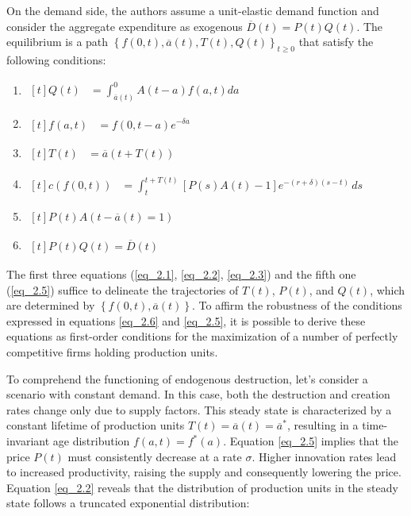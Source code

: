 \documentclass[12pt]{article}
\begin{document}
On the demand side, the authors assume a unit-elastic demand function and consider the aggregate expenditure as
exogenous 
\(\overline{D}(t)=P(t)Q(t)\). 
The equilibrium is a path \(\left\{f(0,t),\overline{a}(t),T(t),Q(t)\right\}_{t \geq 0}\) that satisfy the following
conditions:
\begin{enumerate}
    \item \label{eq_2.1} $ \begin{aligned}[t]
        Q(t) &= \int_{\overline{a}(t)}^{0}A(t-a)f(a,t)da
    \end{aligned}$
    \item \label{eq_2.2}$ \begin{aligned}[t]
        f(a,t)&=f(0,t-a)e^{-\delta a}      
    \end{aligned}$
    \item \label{eq_2.3}$ \begin{aligned}[t]
        T(t)&=\overline{a}\left(t+T(t)\right)        
    \end{aligned}$
    \item \label{eq_2.4}$ \begin{aligned}[t]
        c(f(0,t))&=\int_{t}^{t+T(t)}\left[P(s)A(t)-1\right]e^{-(r+\delta)(s-t)}\,ds
    \end{aligned}$
    \item \label{eq_2.5}$ \begin{aligned}[t]
        P(t)A(t-\overline{a}(t)=1)
    \end{aligned}$
    \item \label{eq_2.6}$ \begin{aligned}[t]
        P(t)Q(t)=\overline{D}(t)
    \end{aligned}$
\end{enumerate}
The first three equations (\ref{eq_2.1}, \ref{eq_2.2}, \ref{eq_2.3}) and the fifth one (\ref{eq_2.5}) suffice to
delineate the trajectories of \(T(t)\), \(P(t)\), and \(Q(t)\), which are determined by \(\left\{f(0,t),
\overline{a}(t)\right\}\). To affirm the robustness of the conditions expressed in equations \ref{eq_2.6} and
\ref{eq_2.5}, it is possible to derive these equations as first-order conditions for the maximization of a number of
perfectly competitive firms holding production units. 

To comprehend the functioning of endogenous destruction, let's consider a scenario with constant demand. In this case,
both the destruction and creation rates change only due to supply factors. This steady state is characterized by a
constant lifetime of production units \(T(t) = \overline{a}(t) = \overline{a}^*\), resulting in a time-invariant age
distribution \(f(a,t) = f^*(a)\). Equation \ref{eq_2.5} implies that the price \(P(t)\) must consistently decrease at a
rate \(\sigma\). Higher innovation rates lead to increased productivity, raising the supply and consequently lowering
the price. Equation \ref{eq_2.2} reveals that the distribution of production units in the steady state follows a
truncated exponential distribution: 
\end{document}
